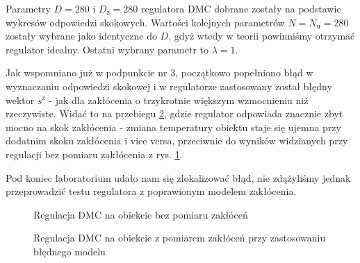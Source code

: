 Parametry $ D = 280 $ i $ D_\mathrm{z} = 280 $ regulatora DMC dobrane zostały na podstawie wykresów odpowiedzi skokowych. Wartości kolejnych parametrów $ N = N_\mathrm{u} = 280 $ zostały wybrane jako identyczne do $ D $, gdyż wtedy w teorii powinniśmy otrzymać regulator idealny. Ostatni wybrany parametr to $ \lambda = 1 $.

Jak wspomniano już w podpunkcie nr 3, początkowo popełniono błąd w wyznaczaniu odpowiedzi skokowej i w regulatorze zastosowany został błędny wektor $ s^{\mathrm{z}} $ - jak dla zakłócenia o trzykrotnie większym wzmocnieniu niż rzeczywiste. Widać to na przebiegu \ref{R8}, gdzie regulator odpowiada znacznie zbyt mocno na skok zakłócenia - zmiana temperatury obiektu staje się ujemna przy dodatnim skoku zakłócenia i vice versa, przeciwnie do wyników widzianych przy regulacji bez pomiaru zakłócenia z rys. \ref{R7}.

Pod koniec laboratorium udało nam się zlokalizować błąd, nie zdążyliśmy jednak przeprowadzić testu regulatora z poprawionym modelem zakłócenia.


\begin{figure}[ht]
\centering

\caption{Regulacja DMC na obiekcie bez pomiaru zakłóceń}
\label{R7}
\end{figure}

\begin{figure}[ht]
\centering

\caption{Regulacja DMC na obiekcie z pomiarem zakłóceń przy zastosowaniu błędnego modelu}
\label{R8}
\end{figure}
